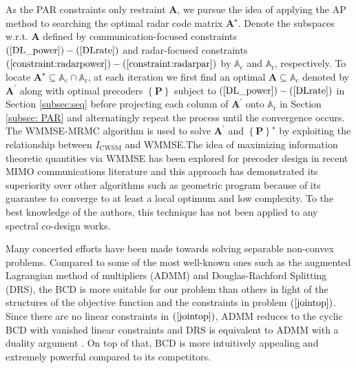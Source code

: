 \documentclass[9pt,journal]{IEEEtran}
\newcommand{\paren}[1]{\left({#1}\right)}
\newcommand{\braces}[1]{{\left\{ {#1}\right\}}}
\theoremstyle{definition}
\begin{document}
As the PAR constraints only restraint $\mathbf{A}$, we pursue the idea of applying the AP method to searching the optimal radar code matrix $\mathbf{A}^\star$.  Denote the subspaces w.r.t. $\mathbf{A}$ defined by communication-focused constraints $\paren{\mathrm{\ref{DL_power}}}-\paren{\mathrm{\ref{DLrate}}}$ and radar-focused constraints $\paren{\mathrm{\ref{constraint:radarpower}}}-\paren{\mathrm{\ref{constraint:radarpar}}}$ by $\mathbb{A}_{\textrm{c}}$ and $\mathbb{A}_{\textrm{r}}$, respectively. To locate $\mathbf{A}^\star\subseteq\mathbb{A}_{\textrm{c}}\cap\mathbb{A}_{\textrm{r}}$, at each iteration we first find an optimal $\mathbf{A}\subseteq\mathbb{A}_{\textrm{c}}$ denoted by $\mathbf{A}^\prime$ along with optimal precoders $\braces{\mathbf{P}}$ subject to $\paren{\mathrm{\ref{DL_power}}}-\paren{\mathrm{\ref{DLrate}}}$ in Section \ref{subsec:seq} before projecting each column of $\mathbf{A}^\prime$ onto $\mathbb{A}_{\textrm{r}}$ in Section \ref{subsec: PAR} and alternatingly repeat the process until the convergence occurs. The WMMSE-MRMC algorithm is used to solve $\mathbf{A}^\prime$ and $\braces{\mathbf{P}}^\star$ by exploiting the relationship between $I_{\textrm{CWSM}}$ and WMMSE.The idea of maximizing information theoretic quantities via WMMSE has been explored for precoder design in recent MIMO communications literature\cite{Luo2011IterativeWMMSE,FD_WMMSE} and this approach has demonstrated its superiority over other algorithms such as geometric program because of its guarantee to converge to at least a local optimum and low complexity\cite{Luo2011IterativeWMMSE}. To the best knowledge of the authors, this technique has not been applied to any spectral co-design works. %

Many concerted efforts have been made towards solving separable non-convex problems. Compared to some of the most well-known ones such as the augmented Lagrangian
method of multipliers (ADMM) and Douglas-Rachford Splitting (DRS), the BCD is more suitable for our problem than others in light of the structures of the objective function and the constraints in problem $\paren{\mathrm{\ref{jointop}}}$. Since there are no linear constraints in $\paren{\mathrm{\ref{jointop}}}$, ADMM reduces to the cyclic BCD with vanished linear constraints and DRS is equivalent to ADMM with a duality argument \cite{ADMMBCD}. On top of that, BCD is more intuitively appealing and extremely powerful compared to its competitors. %
  
\end{document}
